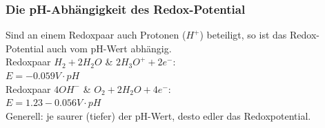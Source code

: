 \subsubsection{Die pH-Abhängigkeit des Redox-Potential}
Sind an einem Redoxpaar auch Protonen ($H^+$) beteiligt, so ist das Redox-Potential auch vom pH-Wert abhängig.\\
Redoxpaar $H_2 + 2 H_2O$ \& $2 H_3O^+ + 2 e^-$: \\ $E = -0.059V \cdot pH$ \\
Redoxpaar $4 OH^-$ \& $O_2 + 2 H_2O + 4 e^-$: \\ $E = 1.23 - 0.056V \cdot pH$ \\
Generell: je saurer (tiefer) der pH-Wert, desto edler das Redoxpotential. 


